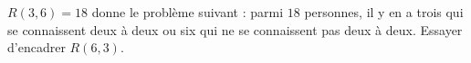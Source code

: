 $R(3, 6) = 18$ donne le problème suivant : parmi $18$ personnes, il y en a trois qui se connaissent deux à deux ou six qui ne se connaissent pas deux à deux. Essayer d'encadrer $R(6, 3)$.
